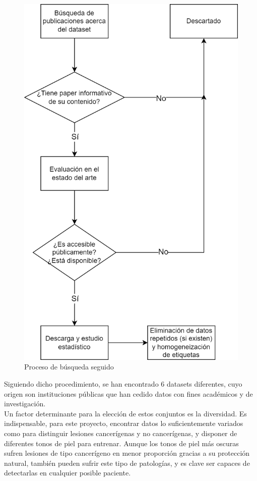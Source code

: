 \begin{figure}[H]
	\centering
	\includegraphics[scale=0.7]{imagenes/DiagramaBusqueda.png}
	\caption{Proceso de búsqueda seguido}
\end{figure}

Siguiendo dicho procedimiento, se han encontrado 6 datasets diferentes, cuyo origen son instituciones públicas que han cedido datos con fines académicos y de investigación.\\

Un factor determinante para la elección de estos conjuntos es la diversidad. Es indispensable, para este proyecto, encontrar datos lo suficientemente variados como para distinguir lesiones cancerígenas y no cancerígenas, y disponer de diferentes tonos de piel para entrenar. Aunque los tonos de piel más oscuras sufren lesiones de tipo cancerígeno en menor proporción gracias a su protección natural, también pueden sufrir este tipo de patologías, y es clave ser capaces de detectarlas en cualquier posible paciente.

